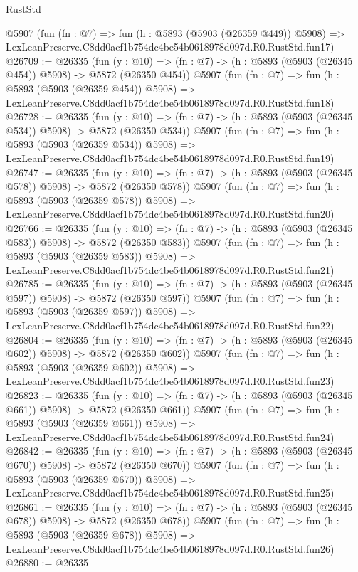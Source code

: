 \begin{lexlean}{RustStd}
\begin{coremodule}
    @5907
    (fun (fn : @7) =>
    fun (h : @5893 (@5903 (@26359 @449)) @5908) =>
    LexLeanPreserve.C8dd0acf1b754dc4be54b0618978d097d.R0.RustStd.fun17)
@26709 := @26335
    (fun (y : @10) => (fn : @7) -> (h : @5893 (@5903 (@26345 @454)) @5908) -> @5872 (@26350 @454))
    @5907
    (fun (fn : @7) =>
    fun (h : @5893 (@5903 (@26359 @454)) @5908) =>
    LexLeanPreserve.C8dd0acf1b754dc4be54b0618978d097d.R0.RustStd.fun18)
@26728 := @26335
    (fun (y : @10) => (fn : @7) -> (h : @5893 (@5903 (@26345 @534)) @5908) -> @5872 (@26350 @534))
    @5907
    (fun (fn : @7) =>
    fun (h : @5893 (@5903 (@26359 @534)) @5908) =>
    LexLeanPreserve.C8dd0acf1b754dc4be54b0618978d097d.R0.RustStd.fun19)
@26747 := @26335
    (fun (y : @10) => (fn : @7) -> (h : @5893 (@5903 (@26345 @578)) @5908) -> @5872 (@26350 @578))
    @5907
    (fun (fn : @7) =>
    fun (h : @5893 (@5903 (@26359 @578)) @5908) =>
    LexLeanPreserve.C8dd0acf1b754dc4be54b0618978d097d.R0.RustStd.fun20)
@26766 := @26335
    (fun (y : @10) => (fn : @7) -> (h : @5893 (@5903 (@26345 @583)) @5908) -> @5872 (@26350 @583))
    @5907
    (fun (fn : @7) =>
    fun (h : @5893 (@5903 (@26359 @583)) @5908) =>
    LexLeanPreserve.C8dd0acf1b754dc4be54b0618978d097d.R0.RustStd.fun21)
@26785 := @26335
    (fun (y : @10) => (fn : @7) -> (h : @5893 (@5903 (@26345 @597)) @5908) -> @5872 (@26350 @597))
    @5907
    (fun (fn : @7) =>
    fun (h : @5893 (@5903 (@26359 @597)) @5908) =>
    LexLeanPreserve.C8dd0acf1b754dc4be54b0618978d097d.R0.RustStd.fun22)
@26804 := @26335
    (fun (y : @10) => (fn : @7) -> (h : @5893 (@5903 (@26345 @602)) @5908) -> @5872 (@26350 @602))
    @5907
    (fun (fn : @7) =>
    fun (h : @5893 (@5903 (@26359 @602)) @5908) =>
    LexLeanPreserve.C8dd0acf1b754dc4be54b0618978d097d.R0.RustStd.fun23)
@26823 := @26335
    (fun (y : @10) => (fn : @7) -> (h : @5893 (@5903 (@26345 @661)) @5908) -> @5872 (@26350 @661))
    @5907
    (fun (fn : @7) =>
    fun (h : @5893 (@5903 (@26359 @661)) @5908) =>
    LexLeanPreserve.C8dd0acf1b754dc4be54b0618978d097d.R0.RustStd.fun24)
@26842 := @26335
    (fun (y : @10) => (fn : @7) -> (h : @5893 (@5903 (@26345 @670)) @5908) -> @5872 (@26350 @670))
    @5907
    (fun (fn : @7) =>
    fun (h : @5893 (@5903 (@26359 @670)) @5908) =>
    LexLeanPreserve.C8dd0acf1b754dc4be54b0618978d097d.R0.RustStd.fun25)
@26861 := @26335
    (fun (y : @10) => (fn : @7) -> (h : @5893 (@5903 (@26345 @678)) @5908) -> @5872 (@26350 @678))
    @5907
    (fun (fn : @7) =>
    fun (h : @5893 (@5903 (@26359 @678)) @5908) =>
    LexLeanPreserve.C8dd0acf1b754dc4be54b0618978d097d.R0.RustStd.fun26)
@26880 := @26335

\end{coremodule}
\end{lexlean}
